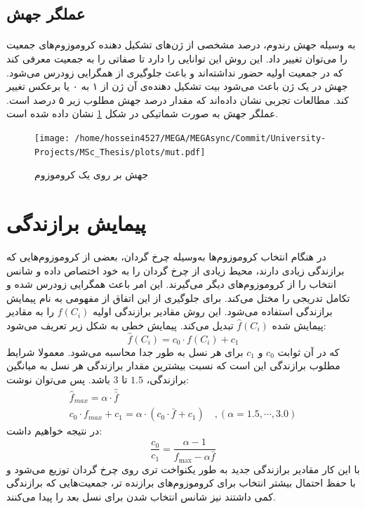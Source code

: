 \documentclass[a4paper,titlepage,12pt,fleqn,oneside]{report}
\begin{document}
	\subsection{عملگر جهش}
	\paragraph{}
	به وسیله جهش رندوم، درصد مشخصی از ژن‌های تشکیل دهنده کروموزوم‌های جمعیت را می‌توان تغییر داد. این روش این توانایی را دارد تا صفاتی را به جمعیت معرفی کند که در جمعیت اولیه حضور نداشته‌ا‌ند و باعث جلوگیری از همگرایی زودرس می‌شود. جهش در یک ژن باعث می‌شود بیت تشکیل دهنده‌ی آن ژن از ۱ به ۰ یا برعکس تغییر کند. مطالعات تجربی نشان داده‌ا‌ند که مقدار درصد جهش مطلوب زیر ۵ درصد است. عملگر جهش به صورت شماتیکی در شکل \ref{fig:mut} نشان داده شده است.
	\begin{figure}[h]
		\centering
		\texttt{[image: /home/hossein4527/MEGA/MEGAsync/Commit/University-Projects/MSc\_Thesis/plots/mut.pdf]}
		\caption{جهش بر روی یک کروموزوم}
		\label{fig:mut}
	\end{figure}
	\section{پیمایش برازندگی}
	در هنگام انتخاب کروموزوم‌ها به‌وسیله چرخ گردان، بعضی از کروموزوم‌ها‌یی که برازندگی زیادی دارند، محیط زیادی از چرخ گردان را به خود اختصاص داده و شانس انتخاب را از کروموزوم‌های دیگر می‌گیرند. این امر باعث همگرایی زودرس شده و تکامل تدریجی را مختل می‌کند. برای جلوگیری از این اتفاق از مفهومی به نام پیمایش برازندگی استفاده می‌شود. این روش مقادیر برازندگی اولیه $f\left(C_{i}\right)$ را به مقادیر پیمایش شده $\hat{f}\left(C_{i}\right)$ تبدیل می‌کند. پیمایش خطی به شکل زیر تعریف می‌شود:
	\begin{equation}
		\hat{f}\left(C_{i}\right)=c_{0} \cdot f\left(C_{i}\right)+c_{1}
	\end{equation}
	که در آن ثوابت $c_{0}$ و $c_{1}$ برای هر نسل به طور جدا محاسبه می‌شود. معمولا شرایط مطلوب برازندگی این است که نسبت بیشترین مقدار برازندگی هر نسل به میانگین برازندگی، $1.5$ تا $3$ باشد. پس می‌توان نوشت:
	\begin{equation}
		\begin{array}{l}
			\hat{f}_{m a x}=\alpha \cdot \hat{\bar{f}} \\
			c_{0} \cdot f_{m a x}+c_{1}=\alpha \cdot\left(c_{0} \cdot \bar{f}+c_{1}\right) \quad,(\alpha=1.5, \cdots, 3.0)
		\end{array}
	\end{equation}
	در نتیجه خواهیم داشت:
	\begin{equation}
		\frac{c_{0}}{c_{1}}=\frac{\alpha-1}{f_{\max }-\alpha \bar{f}}
	\end{equation}
	با این کار مقادیر برازندگی جدید به طور یکنواخت تری روی چرخ گردان توزیع می‌شود و با حفظ احتمال بیشتر انتخاب برای کروموزوم‌های برازنده تر، جمعیت‌ها‌یی که برازندگی کمی داشتند نیز شانس انتخاب شدن برای نسل بعد را پیدا می‌کنند.
\end{document}
